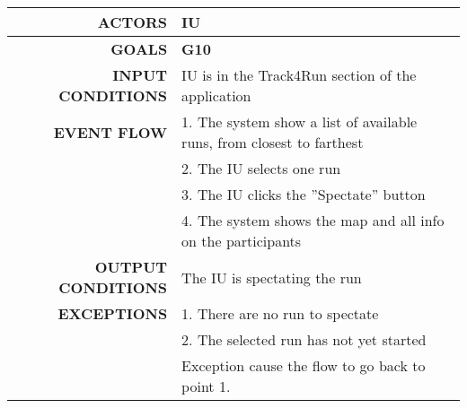 \begin{table}[h!]
\begin{tabular}{|r|p{3in}|}
\hline
\textbf{ACTORS} & IU\\
\hline
\textbf{GOALS} &	\textbf{G10} \\
\hline
\textbf{INPUT CONDITIONS} & IU is in the Track4Run section of the application \\
\hline
\textbf{EVENT FLOW} 
&1. The system show a list of available runs, from closest to farthest \\
&2. The IU selects one run \\
&3. The IU clicks the ''Spectate'' button\\
&4. The system shows the map and all info on the participants\\
\hline
\textbf{OUTPUT CONDITIONS} & The IU is spectating the run\\
\hline
\textbf{EXCEPTIONS} 
&1. There are no run to spectate\\
&2. The selected run has not yet started\\
&Exception cause the flow to go back to point 1.\\
\hline
\end{tabular}
\end{table}